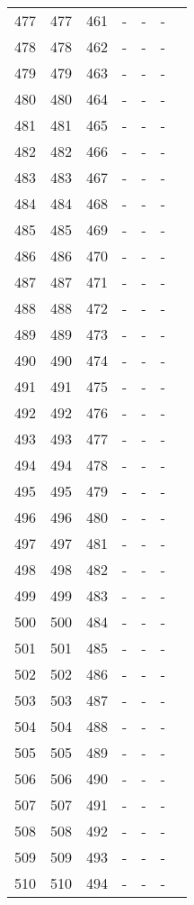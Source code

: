 \begin{longtable}{rrrllll}
  477 & 477 & 461 & - & - & - &  \\ 
  478 & 478 & 462 & - & - & - &  \\ 
  479 & 479 & 463 & - & - & - &  \\ 
  480 & 480 & 464 & - & - & - &  \\ 
  481 & 481 & 465 & - & - & - &  \\ 
  482 & 482 & 466 & - & - & - &  \\ 
  483 & 483 & 467 & - & - & - &  \\ 
  484 & 484 & 468 & - & - & - &  \\ 
  485 & 485 & 469 & - & - & - &  \\ 
  486 & 486 & 470 & - & - & - &  \\ 
  487 & 487 & 471 & - & - & - &  \\ 
  488 & 488 & 472 & - & - & - &  \\ 
  489 & 489 & 473 & - & - & - &  \\ 
  490 & 490 & 474 & - & - & - &  \\ 
  491 & 491 & 475 & - & - & - &  \\ 
  492 & 492 & 476 & - & - & - &  \\ 
  493 & 493 & 477 & - & - & - &  \\ 
  494 & 494 & 478 & - & - & - &  \\ 
  495 & 495 & 479 & - & - & - &  \\ 
  496 & 496 & 480 & - & - & - &  \\ 
  497 & 497 & 481 & - & - & - &  \\ 
  498 & 498 & 482 & - & - & - &  \\ 
  499 & 499 & 483 & - & - & - &  \\ 
  500 & 500 & 484 & - & - & - &  \\ 
  501 & 501 & 485 & - & - & - &  \\ 
  502 & 502 & 486 & - & - & - &  \\ 
  503 & 503 & 487 & - & - & - &  \\ 
  504 & 504 & 488 & - & - & - &  \\ 
  505 & 505 & 489 & - & - & - &  \\ 
  506 & 506 & 490 & - & - & - &  \\ 
  507 & 507 & 491 & - & - & - &  \\ 
  508 & 508 & 492 & - & - & - &  \\ 
  509 & 509 & 493 & - & - & - &  \\ 
  510 & 510 & 494 & - & - & - &  \\ 

\end{longtable}
